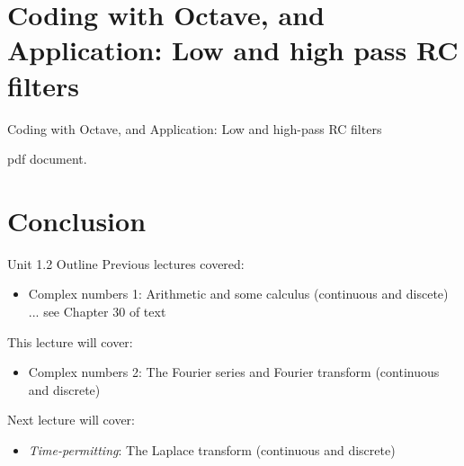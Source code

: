 \documentclass{beamer}
\begin{document}
\section{Coding with Octave, and Application: Low and high pass RC filters}

\begin{frame}{Coding with Octave, and Application: Low and high-pass RC filters}

pdf document.

\end{frame}

\section{Conclusion}

\begin{frame}{Unit 1.2 Outline}
Previous lectures covered:
\begin{itemize}
\item Complex numbers 1: Arithmetic and some calculus (continuous and discete) ... see Chapter 30 of text
\end{itemize}
This lecture will cover:
\begin{itemize}
\item \alert{Complex numbers 2: The Fourier series and Fourier transform (continuous and discrete)}
\end{itemize}
Next lecture will cover:
\begin{itemize}
\item \textit{Time-permitting}: The Laplace transform (continuous and discrete)
\end{itemize}
\end{frame}
\end{document}

